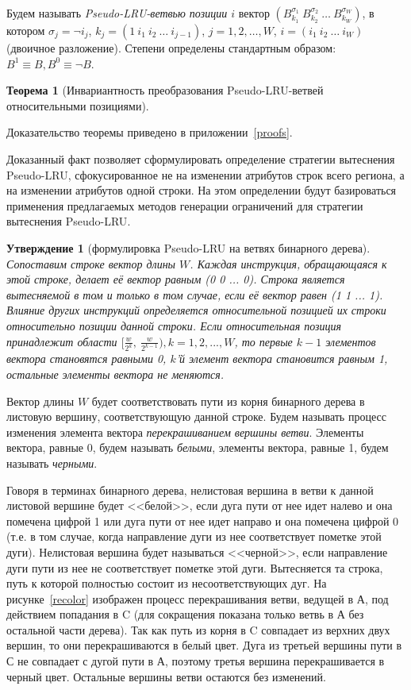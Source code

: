 \documentclass[14pt]{extreport}
\newtheorem{theorem}{Теорема}
\newtheorem{utv}{Утверждение}
\newcommand{\PseudoLRU}{\textsf{Pseudo-LRU}\xspace}
\begin{document}
Будем называть \emph{\PseudoLRU-ветвью позиции $i$} вектор
$(B_{k_1}^{\sigma_1}~B_{k_2}^{\sigma_2}~\dots~B_{k_W}^{\sigma_W})$,
в котором $\sigma_j = \neg i_j$, $k_j = (1~i_1~i_2~\dots~i_{j-1})$,
$j = 1, 2, \dots, W$, $i = (i_1~i_2~\dots~i_W)$ (двоичное
разложение). Степени определены стандартным образом: $B^1 \equiv B,
B^0 \equiv \neg B$.

\begin{theorem}[Инвариантность преобразования \PseudoLRU-ветвей относительными
позициями]\label{thm_pseudoLRU_invariant} \PseudoLRUInvariant
\end{theorem}
Доказательство теоремы приведено в приложении~\ref{proofs}.

Доказанный факт позволяет сформулировать определение стратегии
вытеснения \PseudoLRU, сфокусированное не на изменении атрибутов строк всего
региона,
а на изменении атрибутов одной строки. На этом определении
будут базироваться применения предлагаемых методов генерации
ограничений для стратегии вытеснения \PseudoLRU.

\begin{utv}[формулировка \PseudoLRU на ветвях бинарного дерева]
Сопоставим строке вектор длины $W$. Каждая инструкция, обращающаяся к этой
строке,
делает её вектор равным (0 0 ... 0). Строка является вытесняемой в
том и только в том случае, если её вектор равен (1 1 ... 1).
Влияние других инструкций определяется относительной позицией их
строки относительно позиции данной строки. Если относительная позиция
принадлежит области $[\frac{w}{2^k},~\frac{w}{2^{k-1}}), k =
1,2,...,W$, то первые $k{-}1$ элементов вектора становятся равными
0, $k$'й элемент вектора становится равным 1, остальные элементы
вектора не меняются.
\end{utv}

Вектор длины $W$ будет соответствовать пути из корня бинарного
дерева в листовую вершину, соответствующую данной строке.
Будем называть процесс изменения элемента вектора
\emph{перекрашиванием вершины ветви}. Элементы вектора, равные 0,
будем называть \emph{белыми}, элементы вектора, равные 1, будем
называть \emph{черными}.

Говоря в терминах бинарного дерева, нелистовая вершина в ветви к
данной листовой вершине будет <<белой>>, если дуга пути от нее идет
налево и она помечена цифрой 1 или дуга пути от нее идет направо и она
помечена цифрой 0 (т.е. в том случае, когда направление дуги из нее
соответствует пометке этой дуги). Нелистовая вершина будет
называться <<черной>>, если направление дуги пути из нее не соответствует
пометке этой дуги. Вытесняется та строка, путь к которой
полностью состоит из несоответствующих дуг. На рисунке~\ref{recolor}
изображен процесс перекрашивания ветви, ведущей в А, под действием
попадания в C (для сокращения показана только ветвь в А без
остальной части дерева). Так как путь из корня в C совпадает из
верхних двух вершин, то они перекрашиваются в белый цвет. Дуга из
третьей вершины пути в С не совпадает с дугой пути в А, поэтому
третья вершина перекрашивается в черный цвет. Остальные вершины
ветви остаются без изменений.
\end{document}
